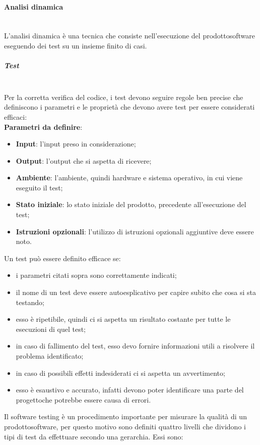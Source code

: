 \paragraph{Analisi dinamica} \mbox{}\\ [1mm]
L'analisi dinamica è una tecnica che consiste nell'esecuzione del prodotto\glosp software eseguendo dei test su un insieme finito di casi.
\subparagraph{Test}\mbox{}\\ [1mm]
Per la corretta verifica del codice, i test devono seguire regole ben precise che definiscono i parametri e le proprietà che devono avere test per essere considerati efficaci: \mbox{}\\ [1mm]
\textbf{Parametri da definire}:
\begin{itemize}
	\item \textbf{Input}: l'input preso in considerazione;
	\item \textbf{Output}: l'output che si aspetta di ricevere;
	\item \textbf{Ambiente}: l'ambiente, quindi hardware e sistema operativo, in cui viene eseguito il test;
	\item \textbf{Stato iniziale}: lo stato iniziale del prodotto\glo, precedente all'esecuzione del test;
	\item \textbf{Istruzioni opzionali}: l'utilizzo di istruzioni opzionali aggiuntive deve essere noto.
\end{itemize} 
Un test può essere definito efficace se:
\begin{itemize}
	\item i parametri citati sopra sono correttamente indicati;
	\item il nome di un test deve essere autoesplicativo per capire subito che cosa si sta testando;
	\item esso è ripetibile, quindi ci si aspetta un risultato costante per tutte le esecuzioni di quel test;
	\item in caso di fallimento del test, esso devo fornire informazioni utili a risolvere il problema identificato;
	\item in caso di possibili effetti indesiderati ci si aspetta un avvertimento;
	\item esso è esaustivo e accurato, infatti devono poter identificare una parte del progetto\glosp che potrebbe essere causa di errori.
\end{itemize}
Il software testing è un procedimento importante per misurare la qualità di un prodotto\glosp software, per questo motivo sono definiti quattro livelli che dividono i tipi di test da effettuare secondo una gerarchia. Essi sono: 
